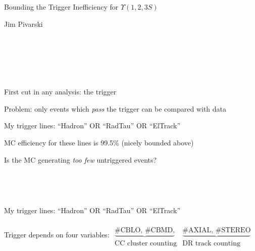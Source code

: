 \documentclass[landscape]{article}
\begin{document}
\huge
\renewcommand{\labelitemi}{-}
\setlength{\parindent}{0 cm}

\mbox{ }

\vfill

\mbox{ }

\vfill

\begin{center}
  Bounding the Trigger Inefficiency for $\Upsilon(1,2,3S)$

  \vfill

  Jim Pivarski
\end{center}

\vfill

\mbox{ }

\vfill

\mbox{ }

\pagebreak

\mbox{ }

\vfill

First cut in any analysis: the trigger

\vfill

Problem: only events which {\it pass} the trigger can be compared with
data

\vfill

My trigger lines: ``Hadron'' OR ``RadTau'' OR ``ElTrack''

\vfill

MC efficiency for these lines is 99.5\% (nicely bounded above)

\vfill

Is the MC generating {\it too few} untriggered events?

\vfill

\mbox{ }

\pagebreak

\mbox{ }

\vfill

My trigger lines: ``Hadron'' OR ``RadTau'' OR ``ElTrack''

\vspace{0.5 cm}

Trigger depends on four variables: $\begin{array}{c} \\ \underbrace{\mbox{\#CBLO, \#CBMD,}} \\ \mbox{CC cluster counting} \end{array} \begin{array}{c} \\ \underbrace{\mbox{\#AXIAL, \#STEREO}} \\ \mbox{DR track counting} \end{array}$
\end{document}

